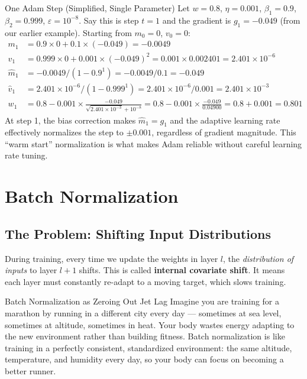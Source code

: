 \begin{examplebox}{One Adam Step (Simplified, Single Parameter)}
Let $w = 0.8$, $\eta = 0.001$, $\beta_1 = 0.9$, $\beta_2 = 0.999$, $\varepsilon = 10^{-8}$. Say this is step $t=1$ and the gradient is $g_1 = -0.049$ (from our earlier example). Starting from $m_0 = 0$, $v_0 = 0$:
\begin{align*}
    m_1 &= 0.9 \times 0 + 0.1 \times (-0.049) = -0.0049 \\
    v_1 &= 0.999 \times 0 + 0.001 \times (-0.049)^2 = 0.001 \times 0.002401 = 2.401 \times 10^{-6} \\
    \hat{m}_1 &= -0.0049 / (1 - 0.9^1) = -0.0049 / 0.1 = -0.049 \\
    \hat{v}_1 &= 2.401 \times 10^{-6} / (1 - 0.999^1) = 2.401 \times 10^{-6} / 0.001 = 2.401 \times 10^{-3} \\
    w_1 &= 0.8 - 0.001 \times \frac{-0.049}{\sqrt{2.401 \times 10^{-3}} + 10^{-8}}
          = 0.8 - 0.001 \times \frac{-0.049}{0.04900}
          = 0.8 + 0.001 = \mathbf{0.801}
\end{align*}
At step 1, the bias correction makes $\hat{m}_1 = g_1$ and the adaptive learning rate effectively normalizes the step to $\pm 0.001$, regardless of gradient magnitude. This ``warm start'' normalization is what makes Adam reliable without careful learning rate tuning.
\end{examplebox}

\section{Batch Normalization}
\label{sec:batchnorm}

\subsection{The Problem: Shifting Input Distributions}

During training, every time we update the weights in layer $l$, the \emph{distribution of inputs} to layer $l+1$ shifts. This is called \textbf{internal covariate shift}. It means each layer must constantly re-adapt to a moving target, which slows training.

\begin{analogybox}{Batch Normalization as Zeroing Out Jet Lag}
Imagine you are training for a marathon by running in a different city every day --- sometimes at sea level, sometimes at altitude, sometimes in heat. Your body wastes energy adapting to the new environment rather than building fitness. Batch normalization is like training in a perfectly consistent, standardized environment: the same altitude, temperature, and humidity every day, so your body can focus on becoming a better runner.
\end{analogybox}

